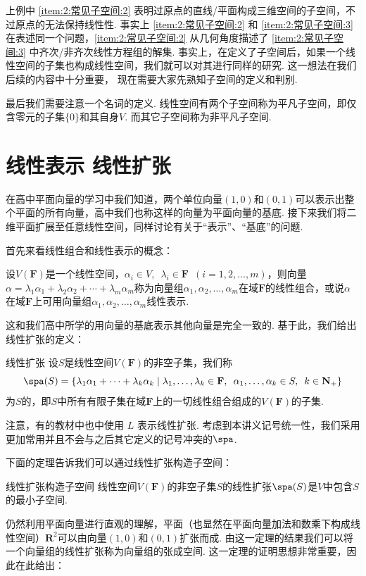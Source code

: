 上例中 \ref*{item:2:常见子空间:2} 表明过原点的直线/平面构成三维空间的子空间，不过原点的无法保持线性性. 事实上 \ref*{item:2:常见子空间:2} 和 \ref*{item:2:常见子空间:3} 在表述同一个问题，\ref*{item:2:常见子空间:2} 从几何角度描述了 \ref*{item:2:常见子空间:3} 中齐次/非齐次线性方程组的解集. 事实上，在定义了子空间后，如果一个线性空间的子集也构成线性空间，我们就可以对其进行同样的研究. 这一想法在我们后续的内容中十分重要， 现在需要大家先熟知子空间的定义和判别.

最后我们需要注意一个名词的定义. 线性空间有两个子空间称为平凡子空间，即仅含零元的子集$\{0\}$和其自身$V$. 而其它子空间称为非平凡子空间.

\section{线性表示 \quad 线性扩张}

在高中平面向量的学习中我们知道，两个单位向量$(1,0)$和$(0,1)$可以表示出整个平面的所有向量，高中我们也称这样的向量为平面向量的基底. 接下来我们将二维平面扩展至任意线性空间，同样讨论有关于``表示''、``基底''的问题.

首先来看线性组合和线性表示的概念：
\begin{definition}{}{}
    设$V(\mathbf{F})$是一个线性空间，$\alpha_i\in V,\enspace\lambda_i\in \mathbf{F}\enspace(i=1,2,\ldots,m)$，则向量$\alpha=\lambda_1\alpha_1+\lambda_2\alpha_2+\cdots+\lambda_m\alpha_m$称为向量组$\alpha_1,\alpha_2,\ldots,\alpha_m$在域$\mathbf{F}$的线性组合，或说$\alpha$在域$\mathbf{F}$上可用向量组$\alpha_1,\alpha_2,\ldots,\alpha_m$线性表示.
\end{definition}
这和我们高中所学的用向量的基底表示其他向量是完全一致的. 基于此，我们给出线性扩张的定义：
\begin{definition}{线性扩张}{} 
    设$S$是线性空间$V(\mathbf{F})$的非空子集，我们称
    \[ \spa(S)=\{\lambda_1\alpha_1+\cdots+\lambda_k\alpha_k \mid \lambda_1,\ldots,\lambda_k\in\mathbf{F},\enspace\alpha_1,\ldots,\alpha_k\in S,\enspace k\in\mathbf{N}_+\} \]
    为$S$的，即$S$中所有有限子集在域$\mathbf{F}$上的一切线性组合组成的$V(\mathbf{F})$的子集.
\end{definition}
注意，有的教材中也中使用 $L$ 表示线性扩张. 考虑到本讲义记号统一性，我们采用更加常用并且不会与之后其它定义的记号冲突的$\spa$.

下面的定理告诉我们可以通过线性扩张构造子空间：
\begin{theorem}{}{线性扩张构造子空间}
    线性空间$V(\mathbf{F})$的非空子集$S$的线性扩张$\spa(S)$是$V$中包含$S$的最小子空间.
\end{theorem}
仍然利用平面向量进行直观的理解，平面（也显然在平面向量加法和数乘下构成线性空间）$\mathbf{R}^2$可以由向量$(1,0)$和$(0,1)$扩张而成. 由这一定理的结果我们可以将一个向量组的线性扩张称为向量组的张成空间. 这一定理的证明思想非常重要，因此在此给出：

